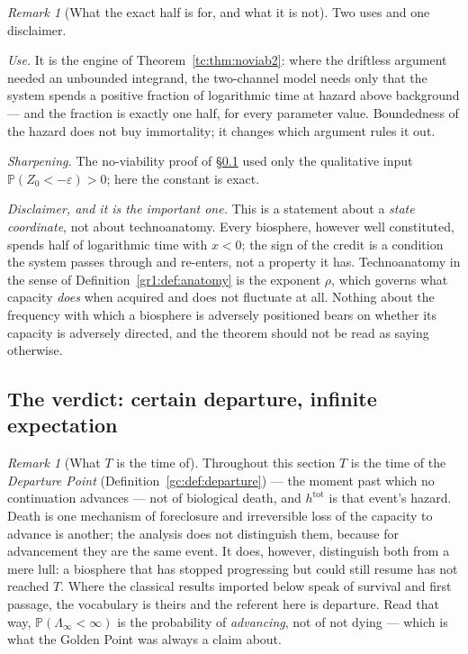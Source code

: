 \documentclass[11pt]{article}
\numberwithin{equation}{section}
\theoremstyle{plain}
\theoremstyle{definition}
\theoremstyle{remark}
\newtheorem{remark}[theorem]{Remark}
\newcommand{\PP}{\mathbb{P}}
\begin{document}
\begin{remark}[What the exact half is for, and what it is not]
\label{gr1:rem:halfuse}
Two uses and one disclaimer.

\emph{Use.} It is the engine of Theorem~\ref{tc:thm:noviab2}: where the
driftless argument needed an unbounded integrand, the two-channel model
needs only that the system spends a positive fraction of logarithmic
time at hazard above background --- and the fraction is exactly one
half, for every parameter value. Boundedness of the hazard does not buy
immortality; it changes which argument rules it out.

\emph{Sharpening.} The no-viability proof of
\S\ref{gr1:sub:verdict} used only the qualitative input
$\PP(Z_0<-\varepsilon)>0$; here the constant is exact.

\emph{Disclaimer, and it is the important one.} This is a statement
about a \emph{state coordinate}, not about technoanatomy. Every
biosphere, however well constituted, spends half of logarithmic time
with $x<0$; the sign of the credit is a condition the system passes
through and re-enters, not a property it has. Technoanatomy in the sense
of Definition~\ref{gr1:def:anatomy} is the exponent $\rho$, which governs
what capacity \emph{does} when acquired and does not fluctuate at all.
Nothing about the frequency with which a biosphere is adversely
positioned bears on whether its capacity is adversely directed, and the
theorem should not be read as saying otherwise.
\end{remark}


\subsection{The verdict: certain departure, infinite expectation}
\label{gr1:sub:verdict}\label{sh:sub:verdict}

\begin{remark}[What $T$ is the time of]\label{gr1:rem:whatTis}
Throughout this section $T$ is the time of the \emph{Departure Point}
(Definition~\ref{gc:def:departure}) --- the moment past which no
continuation advances --- not of biological death, and
$h^{\mathrm{tot}}$ is that event's hazard. Death is one mechanism of
foreclosure and irreversible loss of the capacity to advance is
another; the analysis does not distinguish them, because for
advancement they are the same event. It does, however, distinguish both
from a mere lull: a biosphere that has stopped progressing but could
still resume has not reached $T$. Where the classical results imported below speak of survival
and first passage, the vocabulary is theirs and the referent here is
departure. Read that way, $\PP(\Lambda_\infty<\infty)$ is the
probability of \emph{advancing}, not of not dying --- which is what the
Golden Point was always a claim about.
\end{remark}
\end{document}
